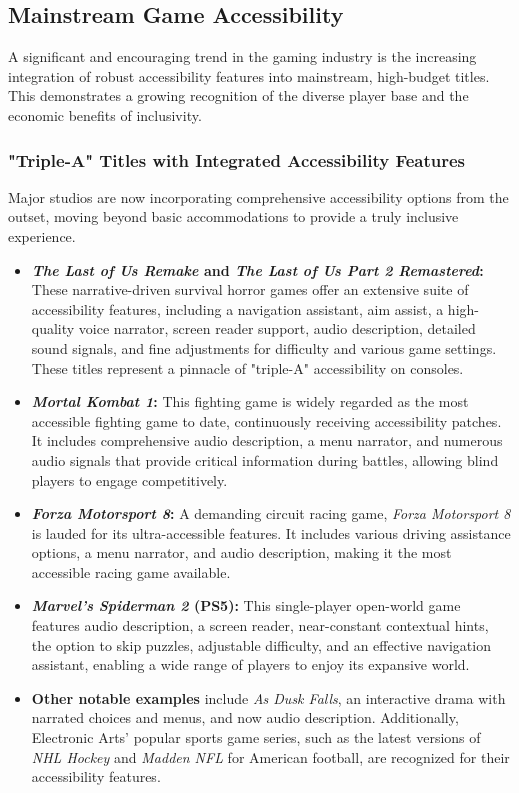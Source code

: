 \subsection{Mainstream Game Accessibility}

A significant and encouraging trend in the gaming industry is the increasing integration of robust accessibility features into mainstream, high-budget titles. This demonstrates a growing recognition of the diverse player base and the economic benefits of inclusivity.

\subsubsection{"Triple-A" Titles with Integrated Accessibility Features}

Major studios are now incorporating comprehensive accessibility options from the outset, moving beyond basic accommodations to provide a truly inclusive experience.
\begin{itemize}
    \item \textbf{\textit{The Last of Us Remake} and \textit{The Last of Us Part 2 Remastered}:} These narrative-driven survival horror games offer an extensive suite of accessibility features, including a navigation assistant, aim assist, a high-quality voice narrator, screen reader support, audio description, detailed sound signals, and fine adjustments for difficulty and various game settings\supercite{LudaccessList}. These titles represent a pinnacle of "triple-A" accessibility on consoles.
    \item \textbf{\textit{Mortal Kombat 1}:} This fighting game is widely regarded as the most accessible fighting game to date, continuously receiving accessibility patches\supercite{LudaccessList}. It includes comprehensive audio description, a menu narrator, and numerous audio signals that provide critical information during battles, allowing blind players to engage competitively\supercite{LudaccessList}.
    \item \textbf{\textit{Forza Motorsport 8}:} A demanding circuit racing game, \textit{Forza Motorsport 8} is lauded for its ultra-accessible features. It includes various driving assistance options, a menu narrator, and audio description, making it the most accessible racing game available\supercite{LudaccessList}.
    \item \textbf{\textit{Marvel's Spiderman 2} (PS5):} This single-player open-world game features audio description, a screen reader, near-constant contextual hints, the option to skip puzzles, adjustable difficulty, and an effective navigation assistant, enabling a wide range of players to enjoy its expansive world\supercite{LudaccessList}.
    \item \textbf{Other notable examples} include \textit{As Dusk Falls}, an interactive drama with narrated choices and menus, and now audio description\supercite{LudaccessList}. Additionally, Electronic Arts' popular sports game series, such as the latest versions of \textit{NHL Hockey} and \textit{Madden NFL} for American football, are recognized for their accessibility features\supercite{LudaccessList}.
\end{itemize}

